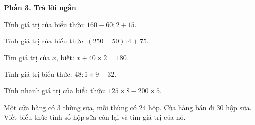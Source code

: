 \textbf{Phần 3. Trả lời ngắn}

\begin{ex} %
Tính giá trị của biểu thức: $160 - 60 : 2 + 15$.
\end{ex}

\begin{ex} %
Tính giá trị của biểu thức: $(250 - 50) : 4 + 75$.
\end{ex}

\begin{ex} %
Tìm giá trị của $x$, biết: $x + 40 \times 2 = 180$.
\end{ex}

\begin{ex} %
Tính giá trị biểu thức: $48 : 6 \times 9 - 32$.
\end{ex}

\begin{ex} %
Tính nhanh giá trị của biểu thức: $125 \times 8 - 200 \times 5$.
\end{ex}

\begin{ex} %
Một cửa hàng có 3 thùng sữa, mỗi thùng có 24 hộp. Cửa hàng bán đi 30 hộp sữa. Viết biểu thức tính số hộp sữa còn lại và tìm giá trị của nó.
\end{ex}
